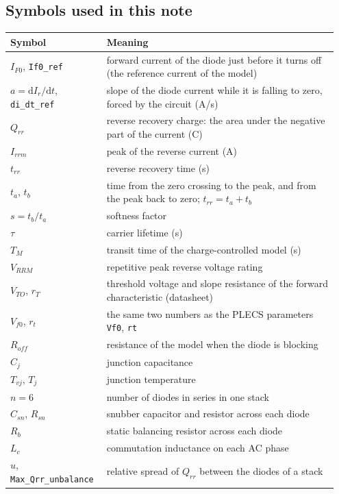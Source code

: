 \documentclass[11pt,a4paper,numbers=noenddot]{scrartcl}
\begin{document}
\begin{onehalfspace}
\section*{Symbols used in this note}\label{symbols-used-in-this-note}

{\small\singlespacing
\begin{longtable}[]{@{}>{\raggedright\arraybackslash}p{0.27\linewidth}>{\raggedright\arraybackslash}p{0.68\linewidth}@{}}
\toprule\noalign{}
Symbol & Meaning \\
\midrule\noalign{}
\endhead
\bottomrule\noalign{}
\endlastfoot
\(I_{F0}\), \texttt{If0\_ref} & forward current of the diode just before it turns off (the reference current of the model) \\
\(a = \mathrm{d}I_r/\mathrm{d}t\), \texttt{di\_dt\_ref} & slope of the diode current while it is falling to zero, forced by the circuit (A/s) \\
\(Q_{rr}\) & reverse recovery charge: the area under the negative part of the current (C) \\
\(I_{rrm}\) & peak of the reverse current (A) \\
\(t_{rr}\) & reverse recovery time (s) \\
\(t_a\), \(t_b\) & time from the zero crossing to the peak, and from the peak back to zero; \(t_{rr} = t_a + t_b\) \\
\(s = t_b/t_a\) & softness factor \\
\(\tau\) & carrier lifetime (s) \\
\(T_M\) & transit time of the charge-controlled model (s) \\
\(V_{RRM}\) & repetitive peak reverse voltage rating \\
\(V_{TO}\), \(r_T\) & threshold voltage and slope resistance of the forward characteristic (datasheet) \\
\(V_{f0}\), \(r_t\) & the same two numbers as the PLECS parameters \texttt{Vf0}, \texttt{rt} \\
\(R_{off}\) & resistance of the model when the diode is blocking \\
\(C_j\) & junction capacitance \\
\(T_{vj}\), \(T_j\) & junction temperature \\
\(n = 6\) & number of diodes in series in one stack \\
\(C_{sn}\), \(R_{sn}\) & snubber capacitor and resistor across each diode \\
\(R_b\) & static balancing resistor across each diode \\
\(L_c\) & commutation inductance on each AC phase \\
\(u\), \texttt{Max\_Qrr\_unbalance} & relative spread of \(Q_{rr}\) between the diodes of a stack \\
\end{longtable}
}
\addtocounter{table}{-1}%


\end{onehalfspace}
\end{document}
